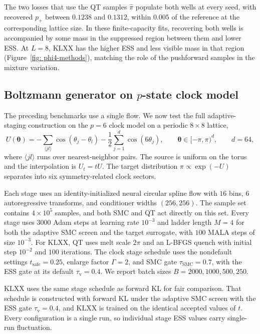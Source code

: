 \documentclass{article}
\begin{document}
The two losses that use the QT samples $\hat\pi$ populate both wells at every seed, with recovered $p_+$ between $0.1238$ and $0.1312$, within $0.005$ of the reference at the corresponding lattice size. In these finite-capacity fits, recovering both wells is accompanied by some mass in the suppressed region between them and lower ESS. At $L=8$, KLXX has the higher ESS and less visible mass in that region (Figure~\ref{fig: phi4-methods}), matching the role of the pushforward samples in the mixture variation.

\subsection{Boltzmann generator on \texorpdfstring{$p$}{p}-state clock model}
\label{subsec: clock}

The preceding benchmarks use a single flow. We now test the full adaptive-staging construction on the $p=6$ clock model on a periodic $8\times8$ lattice,
\begin{equation}
U(\boldsymbol\theta)
=-\sum_{\langle jl\rangle}\cos(\theta_j-\theta_l)
-\frac12\sum_{j=1}^{d}\cos(6\theta_j),
\qquad \boldsymbol\theta\in[-\pi,\pi)^{d},\qquad d=64,
\label{eq: clock-potential}
\end{equation}
where $\langle jl\rangle$ runs over nearest-neighbor pairs. The source is uniform on the torus and the interpolation is $U_t=tU$. The target distribution $\pi\propto\exp(-U)$ separates into six symmetry-related clock sectors.

Each stage uses an identity-initialized neural circular spline flow with $16$ bins, $6$ autoregressive transforms, and conditioner widths $(256,256)$. The sample set contains $4\times10^5$ samples, and both SMC and QT act directly on this set. Every stage uses $3000$ Adam steps at learning rate $10^{-3}$ and ladder length $M=4$ for both the adaptive SMC screen and the target surrogate, with $100$ MALA steps of size $10^{-3}$. For KLXX, QT uses melt scale $2\pi$ and an L-BFGS quench with initial step $10^{-2}$ and $100$ iterations. The clock stage schedule uses the nondefault settings $t_{\mathrm{safe}}=0.25$, enlarge factor $\Gamma=2$, and SMC gate $\tau_{\mathrm{SMC}}=0.7$, {\color{blue}with the ESS gate at its default $\tau_{\mathrm v}=0.4$}. We report batch sizes $B=2000,1000,500,250$.

KLXX uses the same stage schedule as forward KL for fair comparison. That schedule is constructed with forward KL under the adaptive SMC screen with the ESS gate $\tau_{\mathrm v}=0.4$, and KLXX is trained on the identical accepted values of $t$. Every configuration is a single run, so individual stage ESS values carry single-run fluctuation.
\end{document}
